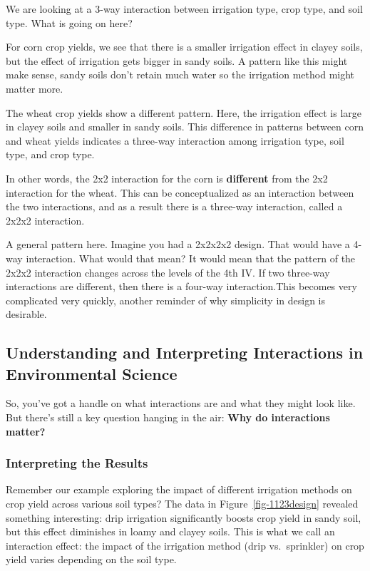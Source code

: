 \documentclass[
  letterpaper,
  DIV=11,
  numbers=noendperiod]{scrreprt}
\begin{document}
We are looking at a 3-way interaction between irrigation type, crop
type, and soil type. What is going on here?

For corn crop yields, we see that there is a smaller irrigation effect
in clayey soils, but the effect of irrigation gets bigger in sandy
soils. A pattern like this might make sense, sandy soils don't retain
much water so the irrigation method might matter more.

The wheat crop yields show a different pattern. Here, the irrigation
effect is large in clayey soils and smaller in sandy soils. This
difference in patterns between corn and wheat yields indicates a
three-way interaction among irrigation type, soil type, and crop type.

In other words, the 2x2 interaction for the corn is \textbf{different}
from the 2x2 interaction for the wheat. This can be conceptualized as an
interaction between the two interactions, and as a result there is a
three-way interaction, called a 2x2x2 interaction.

A general pattern here. Imagine you had a 2x2x2x2 design. That would
have a 4-way interaction. What would that mean? It would mean that the
pattern of the 2x2x2 interaction changes across the levels of the 4th
IV. If two three-way interactions are different, then there is a
four-way interaction.This becomes very complicated very quickly, another
reminder of why simplicity in design is desirable.

\subsection{Understanding and Interpreting Interactions in Environmental
Science}\label{understanding-and-interpreting-interactions-in-environmental-science}

So, you've got a handle on what interactions are and what they might
look like. But there's still a key question hanging in the air:
\textbf{Why do interactions matter?}

\subsubsection{Interpreting the Results}\label{interpreting-the-results}

Remember our example exploring the impact of different irrigation
methods on crop yield across various soil types? The data in
Figure~\ref{fig-1123design} revealed something interesting: drip
irrigation significantly boosts crop yield in sandy soil, but this
effect diminishes in loamy and clayey soils. This is what we call an
interaction effect: the impact of the irrigation method (drip
vs.~sprinkler) on crop yield varies depending on the soil type.
\end{document}
